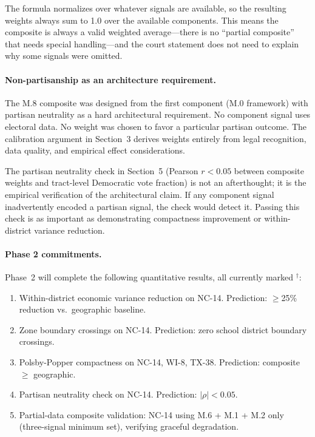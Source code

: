 The formula normalizes over whatever signals are available, so the resulting
weights always sum to 1.0 over the available components.
This means the composite is always a valid weighted average---there is no
``partial composite'' that needs special handling---and the court statement
does not need to explain why some signals were omitted.

\paragraph{Non-partisanship as an architecture requirement.}
The M.8 composite was designed from the first component (M.0 framework) with
partisan neutrality as a hard architectural requirement.
No component signal uses electoral data.
No weight was chosen to favor a particular partisan outcome.
The calibration argument in Section~3 derives weights entirely from legal
recognition, data quality, and empirical effect considerations.

The partisan neutrality check in Section~5 (Pearson $r < 0.05$ between
composite weights and tract-level Democratic vote fraction) is not an
afterthought; it is the empirical verification of the architectural claim.
If any component signal inadvertently encoded a partisan signal, the
check would detect it.
Passing this check is as important as demonstrating compactness improvement
or within-district variance reduction.

\paragraph{Phase 2 commitments.}
Phase~2 will complete the following quantitative results, all currently
marked ${}^{\dagger}$:
\begin{enumerate}
  \item Within-district economic variance reduction on NC-14.
    Prediction: $\geq$25\% reduction vs.\ geographic baseline.
  \item Zone boundary crossings on NC-14.
    Prediction: zero school district boundary crossings.
  \item Polsby-Popper compactness on NC-14, WI-8, TX-38.
    Prediction: composite $\geq$ geographic.
  \item Partisan neutrality check on NC-14.
    Prediction: $|\rho| < 0.05$.
  \item Partial-data composite validation: NC-14 using M.6 + M.1 + M.2 only
    (three-signal minimum set), verifying graceful degradation.
\end{enumerate}

